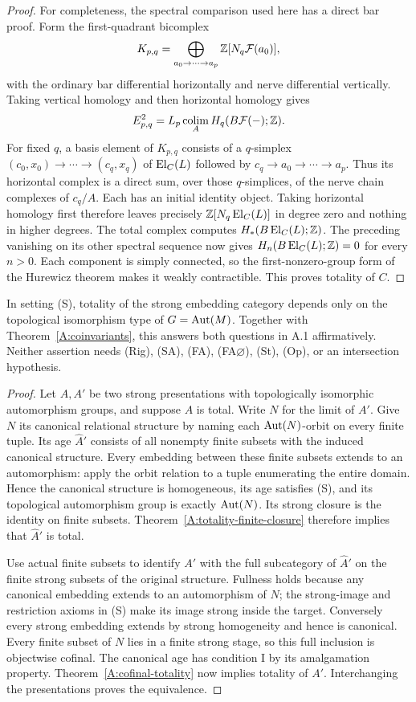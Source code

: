 \begin{proof}
For completeness, the spectral comparison used here has a direct
bar proof. Form the first-quadrant bicomplex
\[
 K_{p,q}=\bigoplus_{a_0\to\cdots\to a_p}
                  \mathbb Z[N_q\mathcal F(a_0)],
\]
with the ordinary bar differential horizontally and nerve
differential vertically. Taking vertical homology and then
horizontal homology gives
\[
 E^2_{p,q}=L_p\operatorname*{colim}_A H_q(B\mathcal F(-);\mathbb Z).
\]
For fixed $q$, a basis element of $K_{p,q}$ consists of a
$q$-simplex
$(c_0,x_0)\to\cdots\to(c_q,x_q)$ of $\operatorname{El}_C(L)$ followed by
$c_q\to a_0\to\cdots\to a_p$. Thus its horizontal complex
is a direct sum, over those $q$-simplices, of the nerve chain
complexes of $c_q/A$. Each has an initial identity object.
Taking horizontal homology first therefore leaves precisely
$\mathbb Z[N_q\operatorname{El}_C(L)]$ in degree zero and nothing in higher degrees.
The total complex computes $H_*(B\operatorname{El}_C(L);\mathbb Z)$. The preceding
vanishing on its other spectral sequence now gives
$H_n(B\operatorname{El}_C(L);\mathbb Z)=0$ for every $n>0$.
Each component is simply connected, so the first-nonzero-group
form of the Hurewicz theorem makes it weakly contractible.
This proves totality of $C$.
\end{proof}

\begin{corollary}
\label{A:totality-group-invariant}
In setting (S), totality of the strong embedding category depends
only on the topological isomorphism type of $G=\operatorname{Aut}(M)$.
Together with Theorem~\ref{A:coinvariants}, this answers both
questions in A.1 affirmatively. Neither assertion needs (Rig),
(SA), (FA), (FA$\varnothing$), (St), (Op), or an intersection
hypothesis.
\end{corollary}
\begin{proof}
Let $A,A'$ be two strong presentations with topologically
isomorphic automorphism groups, and suppose $A$ is total.
Write $N$ for the limit of $A'$. Give $N$ its canonical
relational structure by naming each $\operatorname{Aut}(N)$-orbit on every
finite tuple. Its age $\widehat A'$ consists of all nonempty
finite subsets with the induced canonical structure.
Every embedding between these finite subsets extends to an
automorphism: apply the orbit relation to a tuple enumerating
the entire domain. Hence the canonical structure is homogeneous,
its age satisfies (S), and its topological automorphism group
is exactly $\operatorname{Aut}(N)$. Its strong closure is the identity on
finite subsets. Theorem~\ref{A:totality-finite-closure} therefore
implies that $\widehat A'$ is total.

Use actual finite subsets to identify $A'$ with the full
subcategory of $\widehat A'$ on the finite strong subsets of
the original structure. Fullness holds because any canonical
embedding extends to an automorphism of $N$; the strong-image
and restriction axioms in (S) make its image strong inside the
target. Conversely every strong embedding extends by strong
homogeneity and hence is canonical. Every finite subset of
$N$ lies in a finite strong stage, so this full inclusion is
objectwise cofinal. The canonical age has condition I by its
amalgamation property. Theorem~\ref{A:cofinal-totality} now
implies totality of $A'$. Interchanging the presentations
proves the equivalence.
\end{proof}

